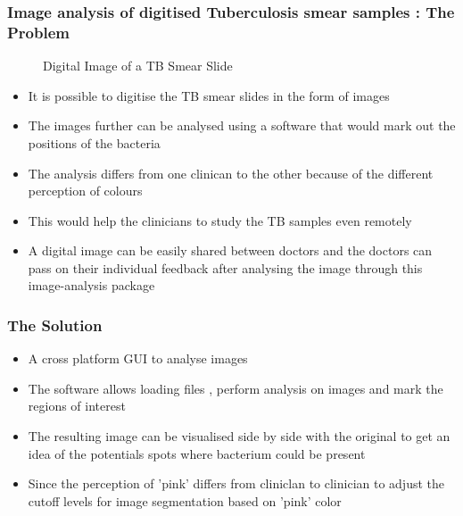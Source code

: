 \documentclass{beamer}
\begin{document}
\begin{frame}[allowframebreaks]
\frametitle{Image analysis of digitised Tuberculosis smear samples : The Problem}
\begin{figure}[!h]
    \begin{center}
    \end{center}
    		\caption{Digital Image of a TB Smear Slide}
\end{figure}
    \begin{itemize}
        \item  It is possible to digitise the TB smear  slides in the form of images
        
        
        \item  The images further can be analysed using a software that would mark out the positions of the bacteria 
        \item  The analysis differs from one clinican to the other because of the different perception of colours
        
        \item  This would help the clinicians to study the TB samples even remotely
        \item A digital image can be easily shared between doctors and the doctors can pass on their individual feedback after analysing the image through this image-analysis package
        

    \end{itemize}
\end{frame}

\begin{frame}
\frametitle{The Solution}
    \begin{itemize}
        \item  A cross platform GUI to analyse images
        \item  The software allows loading files , perform analysis on images and mark the regions of interest
        \item  The resulting image can be visualised  side by side  with the original to get an idea  of the potentials spots where bacterium could be present
        \item  Since the perception of 'pink' differs from  cliniclan to clinician to adjust the cutoff levels for image segmentation based on 'pink' color
    \end{itemize}
\end{frame}
\end{document}
